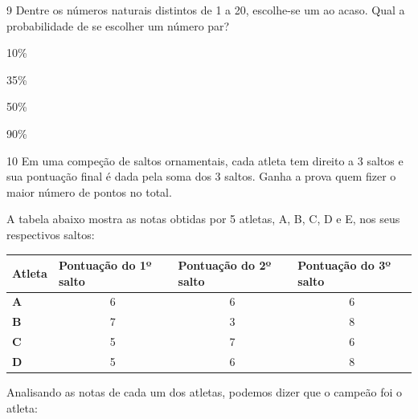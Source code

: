 
\num{9} Dentre os números naturais distintos de 1 a 20, escolhe-se um ao
acaso. Qual a probabilidade de se escolher um número par?

\begin{minipage}{.5\textwidth}
\begin{escolha}
\item
  10\%
\item
  35\%
\item
  50\%
\item
  90\%
\end{escolha}
\end{minipage}

\pagebreak
\num{10} Em uma compeção de saltos ornamentais, cada atleta tem direito
a 3 saltos e sua pontuação final é dada pela soma dos 3 saltos. Ganha a
prova quem fizer o maior número de pontos no total.

A tabela abaixo mostra as notas obtidas por 5 atletas, A, B, C, D e E,
nos seus respectivos saltos:

\begin{center}
\begin{tabular}{l|c|c|c}
\hline
\textbf{Atleta} & \multicolumn{1}{l|}{\textbf{Pontuação do 1º salto}} & \multicolumn{1}{l|}{\textbf{Pontuação do 2º salto}} & \multicolumn{1}{l}{\textbf{Pontuação do 3º salto}} \\ \hline
\textbf{A} & 6 & 6 & 6 \\ \hline
\textbf{B} & 7 & 3 & 8 \\ \hline
\textbf{C} & 5 & 7 & 6 \\ \hline
\textbf{D} & 5 & 6 & 8 \\ \hline
\end{tabular}
\end{center}

Analisando as notas de cada um dos atletas, podemos dizer que o campeão
foi o atleta:

